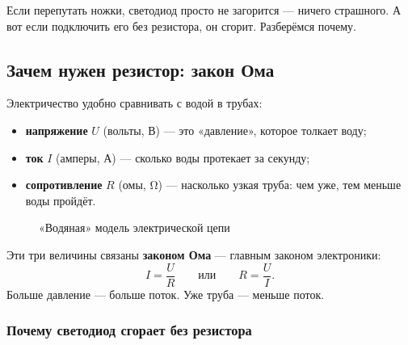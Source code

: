 Если перепутать ножки, светодиод просто не загорится --- ничего страшного. А вот если подключить
его без резистора, он сгорит. Разберёмся почему.

\subsection{Зачем нужен резистор: закон Ома}

Электричество удобно сравнивать с водой в трубах:
\begin{itemize}
  \item \textbf{напряжение} $U$ (вольты, В) --- это «давление», которое толкает воду;
  \item \textbf{ток} $I$ (амперы, А) --- сколько воды протекает за секунду;
  \item \textbf{сопротивление} $R$ (омы, \si{\ohm}) --- насколько узкая труба: чем уже, тем меньше воды пройдёт.
\end{itemize}

\begin{figure}[H]
\centering
{}
\caption{«Водяная» модель электрической цепи}
\end{figure}

Эти три величины связаны \textbf{законом Ома} --- главным законом электроники:
\[
  I = \frac{U}{R}
  \qquad\text{или}\qquad
  R = \frac{U}{I}.
\]
Больше давление --- больше поток. Уже труба --- меньше поток.

\subsubsection{Почему светодиод сгорает без резистора}

